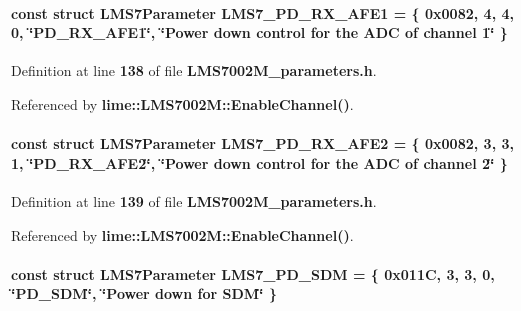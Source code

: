 \paragraph[{L\+M\+S7\+\_\+\+P\+D\+\_\+\+R\+X\+\_\+\+A\+F\+E1}]{\setlength{\rightskip}{0pt plus 5cm}const struct {\bf L\+M\+S7\+Parameter} L\+M\+S7\+\_\+\+P\+D\+\_\+\+R\+X\+\_\+\+A\+F\+E1 = \{ 0x0082, 4, 4, 0, \char`\"{}\+P\+D\+\_\+\+R\+X\+\_\+\+A\+F\+E1\char`\"{}, \char`\"{}\+Power down control for the A\+D\+C of channel 1\char`\"{} \}\hspace{0.3cm}{\ttfamily [static]}}\label{LMS7002M__parameters_8h_ae1ecbf1eaeb4723104ecff386cf6556f}


Definition at line {\bf 138} of file {\bf L\+M\+S7002\+M\+\_\+parameters.\+h}.



Referenced by {\bf lime\+::\+L\+M\+S7002\+M\+::\+Enable\+Channel()}.

\paragraph[{L\+M\+S7\+\_\+\+P\+D\+\_\+\+R\+X\+\_\+\+A\+F\+E2}]{\setlength{\rightskip}{0pt plus 5cm}const struct {\bf L\+M\+S7\+Parameter} L\+M\+S7\+\_\+\+P\+D\+\_\+\+R\+X\+\_\+\+A\+F\+E2 = \{ 0x0082, 3, 3, 1, \char`\"{}\+P\+D\+\_\+\+R\+X\+\_\+\+A\+F\+E2\char`\"{}, \char`\"{}\+Power down control for the A\+D\+C of channel 2\char`\"{} \}\hspace{0.3cm}{\ttfamily [static]}}\label{LMS7002M__parameters_8h_ab0173ec7ec94895dbf98fc7d643148d0}


Definition at line {\bf 139} of file {\bf L\+M\+S7002\+M\+\_\+parameters.\+h}.



Referenced by {\bf lime\+::\+L\+M\+S7002\+M\+::\+Enable\+Channel()}.

\paragraph[{L\+M\+S7\+\_\+\+P\+D\+\_\+\+S\+DM}]{\setlength{\rightskip}{0pt plus 5cm}const struct {\bf L\+M\+S7\+Parameter} L\+M\+S7\+\_\+\+P\+D\+\_\+\+S\+DM = \{ 0x011\+C, 3, 3, 0, \char`\"{}\+P\+D\+\_\+\+S\+D\+M\char`\"{}, \char`\"{}\+Power down for S\+D\+M\char`\"{} \}\hspace{0.3cm}{\ttfamily [static]}}\label{LMS7002M__parameters_8h_aa9f2680001cc9c1dd58338d2c591f087}


